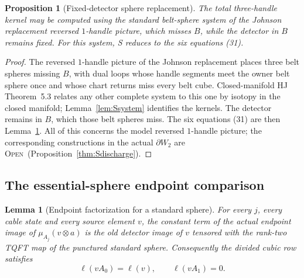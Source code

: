 \documentclass[11pt]{amsart}
\newtheorem{proposition}[theorem]{Proposition}
\newtheorem{lemma}[theorem]{Lemma}
\theoremstyle{definition}
\theoremstyle{remark}
\newcommand{\Open}{\textnormal{\textsc{Open}}}
\begin{document}
\begin{proposition}[Fixed-detector sphere replacement]\label{thm:Sgeometry}
The total three-handle kernel may be computed using the standard belt-sphere
system of the Johnson replacement reversed $1$-handle picture, which misses
$B$, while the detector in $B$ remains fixed.  For this system, S reduces to
the six equations (31).
\end{proposition}

\begin{proof}
The reversed $1$-handle picture of the Johnson replacement places three
belt spheres missing $B$, with dual loops whose handle segments meet the
owner belt sphere once and whose chart returns miss every belt cube.
Closed-manifold HJ Theorem~5.3 relates any other complete
system to this one by isotopy in the closed manifold; Lemma~\ref{lem:Ssystem}
identifies the kernels.  The detector remains in $B$, which those belt
spheres miss.  The six equations (31) are then Lemma~\ref{lem:Sendpoint}.
All of this concerns the model reversed $1$-handle picture; the
corresponding constructions in the actual $\partial W_2$ are \Open\
(Proposition~\ref{thm:Sdischarge}).
\end{proof}

\subsection{The essential-sphere endpoint comparison}

\begin{lemma}[Endpoint factorization for a standard sphere]\label{lem:Sendpoint}
For every \(j\), every cable state and every source element \(v\), the
constant term of the actual endpoint image of
\(\mu_{A_j}(v\otimes a)\) is the old detector image of \(v\) tensored with
the rank-two TQFT map of the punctured standard sphere.  Consequently the
divided cubic row satisfies
\[
\ell(vA_0)=\ell(v),\qquad \ell(vA_1)=0.
\]
\end{lemma}
\end{document}
